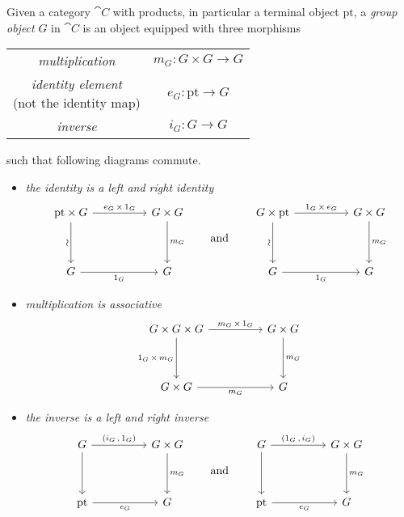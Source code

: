 \vspace*{1em}

\begin{definition}\label{grpobj}
Given a category $\cat{C}$ with products, in particular a terminal object $\mathrm{pt}$, a \emph{group object} $G$ in $\cat{C}$ is an object equipped with three morphisms
\begin{center}
\begin{tabular}{c c}
\emph{multiplication} & $m_G: G \times G \to G$\\[0.5em]
\makecell{\emph{identity element}\\ \small(not the identity map)} & $e_G: \mathrm{pt} \to G$\\[0.5em]
\emph{inverse} & $i_G: G \to G$
\end{tabular}
\end{center}
such that following diagrams commute.
\begin{itemize}
\item \emph{the identity is a left and right identity}
\[\begin{tikzcd}[row sep=huge, column sep = huge]
\mathrm{pt} \times G \arrow[d, "\sim"', sloped] \arrow[r, "e_G\, \times\, 1_G"] & G\times G \arrow[d, "m_G"] \\
G \arrow[r, "1_G"']                                                 & G                       
\end{tikzcd}
\qquad \text{and} \qquad
\begin{tikzcd}[row sep=huge, column sep = huge]
G \times \mathrm{pt} \arrow[d, "\sim"', sloped] \arrow[r, "1_G\, \times\, e_G"] & G\times G \arrow[d, "m_G"] \\
G \arrow[r, "1_G"']                                                 & G                       
\end{tikzcd}\]
\item \emph{multiplication is associative}
\[\begin{tikzcd}[row sep=huge, column sep = huge]
G \times G \times G \arrow[d, "1_G\, \times\, m_G"'] \arrow[r, "m_G\, \times\, 1_G"] & G\times G \arrow[d, "m_G"] \\
G\times G \arrow[r, "m_G"']                                                 & G                       
\end{tikzcd}\]
\item \emph{the inverse is a left and right inverse}
\[\begin{tikzcd}[row sep=huge, column sep = huge]
G \arrow[d] \arrow[r, "{(i_G\,,\,1_G)}"] & G\times G \arrow[d, "m_G"] \\
\mathrm{pt} \arrow[r, "e_G"']                                                 & G                       
\end{tikzcd}
\qquad \text{and} \qquad
\begin{tikzcd}[row sep=huge, column sep = huge]
G \arrow[d] \arrow[r, "{(1_G\,,\,i_G)}"] & G\times G \arrow[d, "m_G"] \\
\mathrm{pt} \arrow[r, "e_G"']                                                 & G                       
\end{tikzcd}\]
\end{itemize}
\end{definition}

